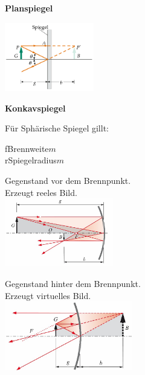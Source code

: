 \textbf{Planspiegel}
\begin{center}
	\includegraphics[height=3cm,keepaspectratio=true]{Images/planspiegel.png}
\end{center}


\textbf{Konkavspiegel}

\begin{center}
	\begin{minipage}{0.3\textwidth}
		Für Sphärische Spiegel gillt:
	\end{minipage}%
	\begin{minipage}{0.3\textwidth}
		\unit{f}{Brennweite}{$m$} \\
		\unit{r}{Spiegelradius}{$m$}
	\end{minipage}
\end{center}

\begin{center}
	\begin{minipage}{0.3\textwidth}
		Gegenstand vor dem Brennpunkt. \\
		Erzeugt reeles Bild. \\
		\includegraphics[height=3cm,keepaspectratio=true]{Images/konkavspiegel1.png}
	\end{minipage}%
	\begin{minipage}{0.3\textwidth}
		Gegenstand hinter dem Brennpunkt. \\
		Erzeugt virtuelles Bild. \\
		\includegraphics[height=3cm,keepaspectratio=true]{Images/konkavspiegel2.png}
	\end{minipage}
\end{center}


